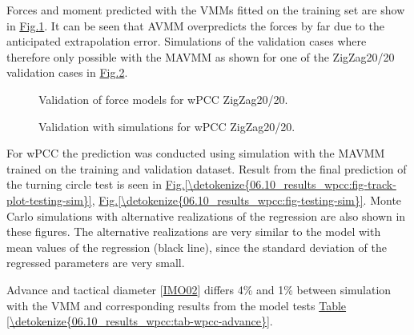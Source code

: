 \documentclass[review]{elsarticle}
\begin{document}
\sphinxAtStartPar
Forces and moment predicted with the VMMs fitted on the training set are show in \hyperref[\detokenize{06.10_results_wpcc:fig-validation-forces}]{Fig.\@ \ref{\detokenize{06.10_results_wpcc:fig-validation-forces}}}. It can be seen that AVMM overpredicts the forces by far due to the anticipated extrapolation error. Simulations of the validation cases where therefore only possible with the MAVMM as shown for one of the ZigZag20/20 validation cases in \hyperref[\detokenize{06.10_results_wpcc:fig-validation-sim}]{Fig.\@ \ref{\detokenize{06.10_results_wpcc:fig-validation-sim}}}.

\begin{figure}[H]
\centering
\capstart

\noindent{}
\caption{Validation of force models for wPCC ZigZag20/20.}\label{\detokenize{06.10_results_wpcc:fig-validation-forces}}\end{figure}

\begin{figure}[H]
\centering
\capstart

\noindent{}
\caption{Validation with simulations for wPCC ZigZag20/20.}\label{\detokenize{06.10_results_wpcc:fig-validation-sim}}\end{figure}

\sphinxAtStartPar
For wPCC the prediction was conducted using simulation with the MAVMM trained on the training and validation dataset. Result from the final prediction of the turning circle test is seen in \hyperref[\detokenize{06.10_results_wpcc:fig-track-plot-testing-sim}]{Fig.\@ \ref{\detokenize{06.10_results_wpcc:fig-track-plot-testing-sim}}}, \hyperref[\detokenize{06.10_results_wpcc:fig-testing-sim}]{Fig.\@ \ref{\detokenize{06.10_results_wpcc:fig-testing-sim}}}. Monte Carlo simulations with alternative realizations of the regression are also shown in these figures. The alternative realizations are very similar to the model with mean values of the regression (black line), since the standard deviation of the regressed parameters are very small.

\sphinxAtStartPar
Advance and tactical diameter {[}\hyperlink{cite.bibligraphy:id16}{IMO02}{]} differs 4\% and 1\% between simulation with the VMM and corresponding results from the model tests \hyperref[\detokenize{06.10_results_wpcc:tab-wpcc-advance}]{Table \ref{\detokenize{06.10_results_wpcc:tab-wpcc-advance}}}.
\end{document}

